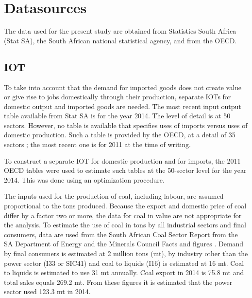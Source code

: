 \documentclass[12pt,english]{article}
\begin{document}
\section{Datasources}

The data used for the present study are obtained from Statistics South Africa (Stat SA), the South African national statistical agency, and from the OECD. %

\subsection{IOT}	

To take into account that the demand for imported goods does not create value or give rise to jobs domestically through their production, separate IOTs for domestic output and imported goods are needed. The most recent input output table available from Stat SA is for the year 2014. The level of detail is at 50 sectors. However, no table is available that specifies uses of imports versus uses of domestic production. Such a table is provided by the OECD, at a detail of 35 sectors ; the most recent one is for 2011 at the time of writing.

To construct a separate IOT for domestic production and for imports, the 2011 OECD tables were used to estimate such tables at the 50-sector level for the year 2014. This was done using an optimization procedure.%


The inputs used for the production of coal, including labour, are assumed proportional to the tons produced. Because the export and domestic price of coal differ by a factor two or more, the data for coal in value are not appropriate for the analysis. To estimate the use of coal in tons by all industrial sectors and final consumers, data are used from the South African Coal Sector Report from the SA Department of Energy \citep{coal2013DoE} and the Minerals Council Facts and figures . Demand by final consumers is estimated at 2 million tons (mt), by industry other than the power sector (I33 or SIC41) and coal to liquids (I16) is estimated at 16 mt. Coal to liquids is estimated to use 31 mt annually. Coal export in 2014 is 75.8 mt and total sales equals 269.2 mt. From these figures it is estimated that the power sector used 123.3 mt in 2014.
\end{document}
